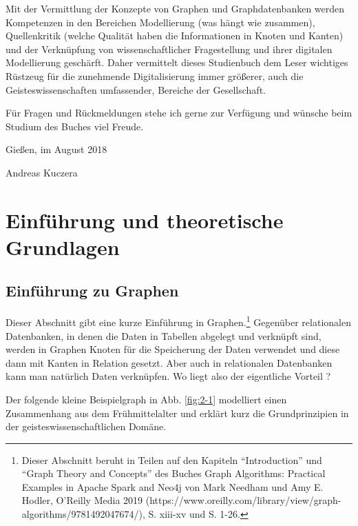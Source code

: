 \documentclass[ngerman,]{scrreprt}
\begin{document}
Mit der Vermittlung der Konzepte von Graphen und Graphdatenbanken werden Kompetenzen in den Bereichen Modellierung (was hängt wie zusammen), Quellenkritik (welche Qualität haben die Informationen in Knoten und Kanten) und der Verknüpfung von wissenschaftlicher Fragestellung und ihrer digitalen Modellierung geschärft. Daher vermittelt dieses Studienbuch dem Leser wichtiges Rüstzeug für die zunehmende Digitalisierung immer größerer, auch die Geisteswissenschaften umfassender, Bereiche der Gesellschaft.

Für Fragen und Rückmeldungen stehe ich gerne zur Verfügung und wünsche beim Studium des Buches viel Freude.

Gießen, im August 2018

Andreas Kuczera


\hypertarget{einfuxfchrung-und-theoretische-grundlagen}{%
\chapter{Einführung und theoretische Grundlagen}\label{einfuxfchrung-und-theoretische-grundlagen}}

\hypertarget{einfuxfchrung-zu-graphen}{%
\section{Einführung zu Graphen}\label{einfuxfchrung-zu-graphen}}

Dieser Abschnitt gibt eine kurze Einführung in Graphen.\footnote{Dieser Abschnitt beruht in Teilen auf den Kapiteln ``Introduction'' und ``Graph Theory and Concepts'' des Buches Graph Algorithms: Practical Examples in Apache Spark and Neo4j von Mark Needham und Amy E. Hodler, O'Reilly Media 2019 (https://www.oreilly.com/library/view/graph-algorithms/9781492047674/), S. xiii-xv und S. 1-26.} Gegenüber relationalen Datenbanken, in denen die Daten in Tabellen abgelegt und verknüpft sind, werden in Graphen Knoten für die Speicherung der Daten verwendet und diese dann mit Kanten in Relation gesetzt. Aber auch in relationalen Datenbanken kann man natürlich Daten verknüpfen. Wo liegt also der eigentliche Vorteil ?

Der folgende kleine Beispielgraph in Abb. \ref{fig:2-1} modelliert einen Zusammenhang aus dem Frühmittelalter und erklärt kurz die Grundprinzipien in der geisteswissenschaftlichen Domäne.
\end{document}
